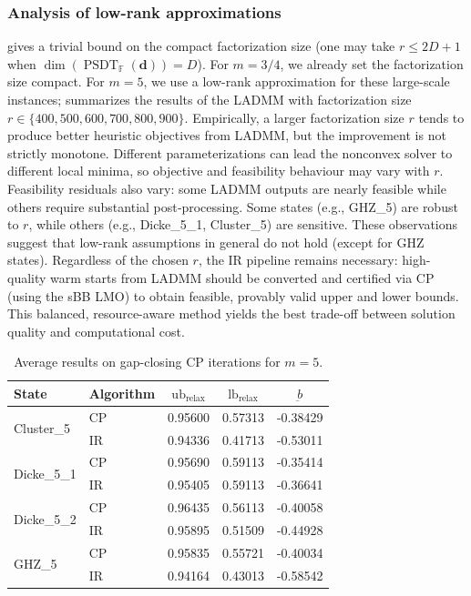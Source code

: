\documentclass[smallextended]{svjour3}
\newcommand{\F}{\mathbb F}
\DeclareMathOperator{\SOST}{PSDT}
\newcommand{\1}{\mathbf{1}}
\newcommand{\relx}{\text{relax}}
\newcommand{\lb}{\text{lb}}
\newcommand{\ub}{\text{ub}}
\newcommand{\vc}[1]{\mathbf{#1}}
\newcommand{\vd}{\vc{d}}
\begin{document}
\subsubsection{Analysis of low-rank approximations}

 gives a trivial bound on the compact factorization size (one may take \(r\le 2D+1\) when \(\dim(\SOST_{\F}(\vd))=D\)). For $m=3/4$, we already set the factorization size compact. For $m=5$, we use a low-rank approximation for these large-scale instances;  summarizes the results of the LADMM with factorization size $r \in \{400, 500, 600, 700, 800, 900\}$.
Empirically, a larger factorization size $r$ tends to produce better heuristic objectives from LADMM, but the improvement is not strictly monotone. Different parameterizations can lead the nonconvex solver to different local minima, so objective and feasibility behaviour may vary with $r$. Feasibility residuals also vary: some LADMM outputs are nearly feasible while others require substantial post‑processing. Some states (e.g., GHZ\_5) are robust to $r$, while others (e.g., Dicke\_5\_1, Cluster\_5) are sensitive. These observations suggest  that low-rank assumptions in general do not hold (except for GHZ states).
Regardless of the chosen \(r\), the IR pipeline remains necessary: high-quality warm starts from LADMM should be converted and certified via CP (using the sBB LMO) to obtain feasible, provably valid upper and lower bounds. This balanced, resource-aware method yields the best trade-off between solution quality and computational cost.

\begin{table}[htb]
\centering
\begin{tabular}{l|lccc}
\toprule
    \textbf{State} & \textbf{Algorithm} & $\ub_{\relx}$ & $\lb_{\relx}$ & $\underbar{b}$   \\
\midrule
\multirow{2}{*}{Cluster\_5}
 & CP & 0.95600 & 0.57313 & -0.38429 \\
 & IR & 0.94336 & 0.41713 & -0.53011 \\
\midrule
\multirow{2}{*}{Dicke\_5\_1}
 & CP & 0.95690 & 0.59113 & -0.35414 \\
 & IR & 0.95405 & 0.59113 & -0.36641 \\
\midrule
\multirow{2}{*}{Dicke\_5\_2}
 & CP & 0.96435 & 0.56113 & -0.40058 \\
 & IR & 0.95895 & 0.51509 & -0.44928 \\
\midrule
\multirow{2}{*}{GHZ\_5}
 & CP & 0.95835 & 0.55721 & -0.40034 \\
 & IR & 0.94164 & 0.43013 & -0.58542 \\
\bottomrule

\end{tabular}
\caption{Average results on gap-closing CP iterations for $m=5$.}
\label{tab.m5CP}
\end{table}
\end{document}
